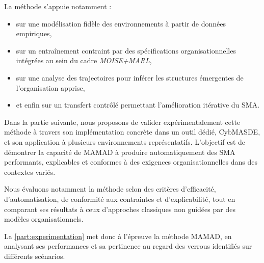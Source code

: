\medskip

\noindent
La méthode s'appuie notamment :
\begin{itemize}
    \item sur une modélisation fidèle des environnements à partir de données empiriques,
    \item sur un entraînement contraint par des spécifications organisationnelles intégrées au sein du cadre \textit{MOISE+MARL},
    \item sur une analyse des trajectoires pour inférer les structures émergentes de l'organisation apprise,
    \item et enfin sur un transfert contrôlé permettant l'amélioration itérative du \ac{SMA}.
\end{itemize}

\noindent
Dans la partie suivante, nous proposons de valider expérimentalement cette méthode à travers son implémentation concrète dans un outil dédié, \ac{CybMASDE}, et son application à plusieurs environnements représentatifs. L'objectif est de démontrer la capacité de \ac{MAMAD} à produire automatiquement des \ac{SMA} performants, explicables et conformes à des exigences organisationnelles dans des contextes variés.

\medskip

\noindent
Nous évaluons notamment la méthode selon des critères d'efficacité, d'automatisation, de conformité aux contraintes et d'explicabilité, tout en comparant ses résultats à ceux d'approches classiques non guidées par des modèles organisationnels.

\bigskip

La \autoref{part:experimentation} met donc à l'épreuve la méthode \ac{MAMAD}, en analysant ses performances et sa pertinence au regard des verrous identifiés sur différents scénarios.
